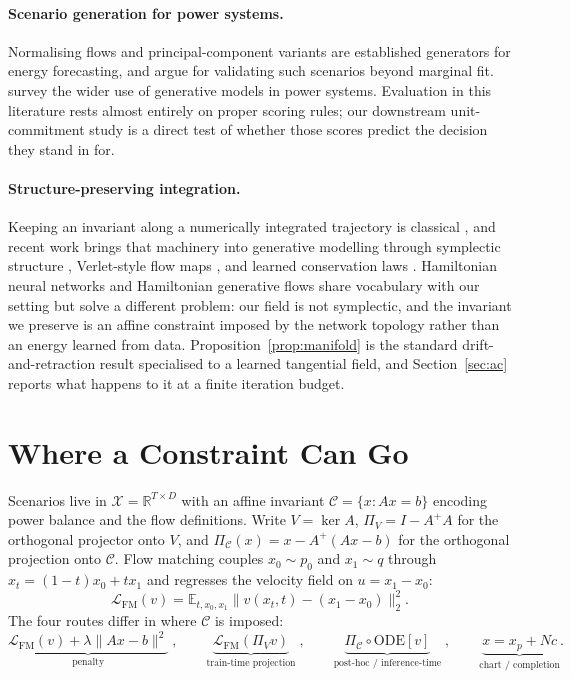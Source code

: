 \documentclass{article}
\begin{document}
\paragraph{Scenario generation for power systems.} Normalising flows
\citep{dumas2022normflows} and principal-component variants \citep{cramer2022pcanf}
are established generators for energy forecasting, and \citet{cramer2022validation}
argue for validating such scenarios beyond marginal fit.
\citet{campbell2024generative} survey the wider use of generative models in power
systems. Evaluation in this literature rests almost entirely on proper scoring rules;
our downstream unit-commitment study is a direct test of whether those scores predict
the decision they stand in for.

\paragraph{Structure-preserving integration.} Keeping an invariant along a
numerically integrated trajectory is classical \citep{hairer2006geometric}, and recent
work brings that machinery into generative modelling through symplectic structure
\citep{chen2021neuralsymplecticform}, Verlet-style flow maps
\citep{erives2024verlet}, and learned conservation laws \citep{alet2021noether}.
Hamiltonian neural networks \citep{greydanus2019hamiltonian} and Hamiltonian generative
flows \citep{holderrieth2024hamiltonian} share vocabulary with our setting but solve a
different problem: our field is not symplectic, and the invariant we preserve is an
affine constraint imposed by the network topology rather than an energy learned from
data. Proposition~\ref{prop:manifold} is the standard drift-and-retraction result
specialised to a learned tangential field, and Section~\ref{sec:ac} reports what happens
to it at a finite iteration budget.

\section{Where a Constraint Can Go}\label{sec:routes}
Scenarios live in $\mathcal X=\mathbb R^{T\times D}$ with an affine invariant
$\mathcal C=\{x: Ax=b\}$ encoding power balance and the flow definitions.
Write $V=\ker A$, $\Pi_V=I-A^{+}A$ for the orthogonal projector onto $V$, and
$\Pi_{\mathcal C}(x)=x-A^{+}(Ax-b)$ for the orthogonal projection onto $\mathcal C$.
Flow matching couples $x_0\sim p_0$ and $x_1\sim q$ through $x_t=(1-t)x_0+tx_1$ and
regresses the velocity field on $u=x_1-x_0$:
\begin{equation}
\mathcal L_{\mathrm{FM}}(v)=\mathbb E_{t,x_0,x_1}\big\|v(x_t,t)-(x_1-x_0)\big\|_2^2 .
\end{equation}
The four routes differ in where $\mathcal C$ is imposed:
\begin{equation}
\underbrace{\mathcal L_{\mathrm{FM}}(v)+\lambda\|Ax-b\|^2}_{\text{penalty}}\;,\qquad
\underbrace{\mathcal L_{\mathrm{FM}}(\Pi_V v)}_{\text{train-time projection}}\;,\qquad
\underbrace{\Pi_{\mathcal C}\!\circ\!\mathrm{ODE}[v]}_{\text{post-hoc / inference-time}}\;,\qquad
\underbrace{x=x_p+Nc}_{\text{chart / completion}} .
\end{equation}
\end{document}
